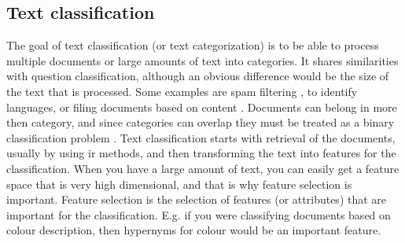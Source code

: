 \subsection{Text classification}
\label{sec:text_classification}
The goal of text classification (or text categorization) is to be able to process multiple documents or large amounts of text into categories. 
It shares similarities with question classification, although an obvious difference would be the size of the text that is processed. 
Some examples are spam filtering \cite{Russell2013, Kaestner2013}, to identify languages, or filing documents based on content \cite{Kaestner2013}.
Documents can belong in more then category, and since categories can overlap they must be treated as a binary classification problem \cite{Joachims1998} .
Text classification starts with retrieval of the documents, usually by using \gls{ir} methods, and then transforming the text into features for the classification. 
When you have a large amount of text, you can easily get a feature space that is very high dimensional, and that is why feature selection is important. 
Feature selection is the selection of features (or attributes) that are important for the classification. 
E.g. if you were classifying documents based on colour description, then hypernyms for colour would be an important feature.


